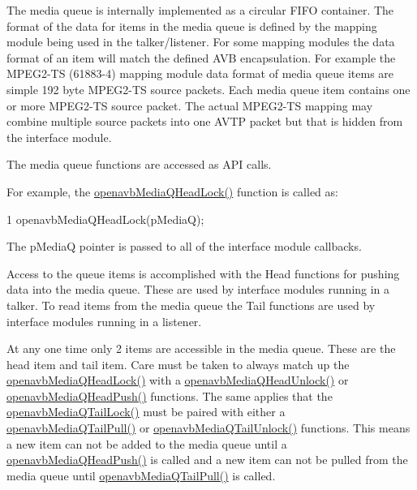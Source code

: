 The media queue is internally implemented as a circular F\+I\+FO container. The format of the data for items in the media queue is defined by the mapping module being used in the talker/listener. For some mapping modules the data format of an item will match the defined A\+VB encapsulation. For example the M\+P\+E\+G2-\/\+TS (61883-\/4) mapping module data format of media queue items are simple 192 byte M\+P\+E\+G2-\/\+TS source packets. Each media queue item contains one or more M\+P\+E\+G2-\/\+TS source packet. The actual M\+P\+E\+G2-\/\+TS mapping may combine multiple source packets into one A\+V\+TP packet but that is hidden from the interface module.

The media queue functions are accessed as A\+PI calls.

For example, the \hyperlink{build_2sdk__eavb_2openavb__mediaq__pub_8h_ae2ce807451447ec2dab9a4284ac61b99}{openavb\+Media\+Q\+Head\+Lock()} function is called as\+: 
\begin{DoxyCode}
1 openavbMediaQHeadLock(pMediaQ);
\end{DoxyCode}
 The p\+MediaQ pointer is passed to all of the interface module callbacks.

Access to the queue items is accomplished with the Head functions for pushing data into the media queue. These are used by interface modules running in a talker. To read items from the media queue the Tail functions are used by interface modules running in a listener.

At any one time only 2 items are accessible in the media queue. These are the head item and tail item. Care must be taken to always match up the \hyperlink{build_2sdk__eavb_2openavb__mediaq__pub_8h_ae2ce807451447ec2dab9a4284ac61b99}{openavb\+Media\+Q\+Head\+Lock()} with a \hyperlink{build_2sdk__eavb_2openavb__mediaq__pub_8h_ac73b08d1568f13b634e2a0f1ef35e11a}{openavb\+Media\+Q\+Head\+Unlock()} or \hyperlink{build_2sdk__eavb_2openavb__mediaq__pub_8h_a0a57c275ac213fdd14c944741c6e9250}{openavb\+Media\+Q\+Head\+Push()} functions. The same applies that the \hyperlink{build_2sdk__eavb_2openavb__mediaq__pub_8h_aafa1645c7e234bd011a70063d368b995}{openavb\+Media\+Q\+Tail\+Lock()} must be paired with either a \hyperlink{build_2sdk__eavb_2openavb__mediaq__pub_8h_ab0525761a2b45c4c14d4fdc80fa24c47}{openavb\+Media\+Q\+Tail\+Pull()} or \hyperlink{build_2sdk__eavb_2openavb__mediaq__pub_8h_a9b57c7a2cfb99521a7e460bd29b3b31a}{openavb\+Media\+Q\+Tail\+Unlock()} functions. This means a new item can not be added to the media queue until a \hyperlink{build_2sdk__eavb_2openavb__mediaq__pub_8h_a0a57c275ac213fdd14c944741c6e9250}{openavb\+Media\+Q\+Head\+Push()} is called and a new item can not be pulled from the media queue until \hyperlink{build_2sdk__eavb_2openavb__mediaq__pub_8h_ab0525761a2b45c4c14d4fdc80fa24c47}{openavb\+Media\+Q\+Tail\+Pull()} is called.

